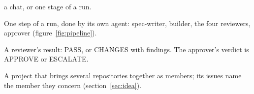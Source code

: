 \begin{description}[style=nextline,leftmargin=1.5em,font=\normalfont\bfseries]
    a chat, or one stage of a run.
  \item[stage]\label{gl:stage} One step of a run, done by its own agent: spec-writer,
    builder, the four reviewers, approver (figure~\ref{fig:pipeline}).
  \item[verdict]\label{gl:verdict} A reviewer's result: PASS, or CHANGES with
    findings. The approver's verdict is APPROVE or ESCALATE.
  \item[workspace project]\label{gl:workspace} A project that brings several
    repositories together as members; its issues name the member they concern (section~\ref{sec:idea}).
\end{description}
